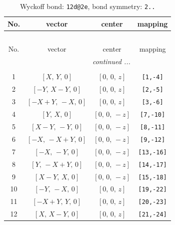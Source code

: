 \documentclass[fleqn,8pt]{jsarticle}
\begin{document}
\begin{longtable}{cccc}
\caption{Wyckoff bond: {\tt 12d@2e}, bond symmetry: {\tt 2..}}
 \\
 \hline \hline
No. & vector & center & mapping \\ \hline \endfirsthead

\multicolumn{3}{l}{\tablename\ \thetable{}} \\
 \hline \hline
No. & vector & center & mapping \\ \hline \endhead

 \hline \hline
\multicolumn{3}{r}{\footnotesize\it continued ...} \\ \endfoot

 \hline \hline
\multicolumn{3}{r}{} \\ \endlastfoot

1 & $\left[ X,\, Y,\, 0 \right]$ & $\left[ 0,\, 0,\, z \right]$ & {\tt [1,-4]} \\ \hline
2 & $\left[ - Y,\, X - Y,\, 0 \right]$ & $\left[ 0,\, 0,\, z \right]$ & {\tt [2,-5]} \\ \hline
3 & $\left[ - X + Y,\, - X,\, 0 \right]$ & $\left[ 0,\, 0,\, z \right]$ & {\tt [3,-6]} \\ \hline
4 & $\left[ Y,\, X,\, 0 \right]$ & $\left[ 0,\, 0,\, - z \right]$ & {\tt [7,-10]} \\ \hline
5 & $\left[ X - Y,\, - Y,\, 0 \right]$ & $\left[ 0,\, 0,\, - z \right]$ & {\tt [8,-11]} \\ \hline
6 & $\left[ - X,\, - X + Y,\, 0 \right]$ & $\left[ 0,\, 0,\, - z \right]$ & {\tt [9,-12]} \\ \hline
7 & $\left[ - X,\, - Y,\, 0 \right]$ & $\left[ 0,\, 0,\, - z \right]$ & {\tt [13,-16]} \\ \hline
8 & $\left[ Y,\, - X + Y,\, 0 \right]$ & $\left[ 0,\, 0,\, - z \right]$ & {\tt [14,-17]} \\ \hline
9 & $\left[ X - Y,\, X,\, 0 \right]$ & $\left[ 0,\, 0,\, - z \right]$ & {\tt [15,-18]} \\ \hline
10 & $\left[ - Y,\, - X,\, 0 \right]$ & $\left[ 0,\, 0,\, z \right]$ & {\tt [19,-22]} \\ \hline
11 & $\left[ - X + Y,\, Y,\, 0 \right]$ & $\left[ 0,\, 0,\, z \right]$ & {\tt [20,-23]} \\ \hline
12 & $\left[ X,\, X - Y,\, 0 \right]$ & $\left[ 0,\, 0,\, z \right]$ & {\tt [21,-24]} \\
\end{longtable}
\renewcommand{\arraystretch}{1.2}
\end{document}
